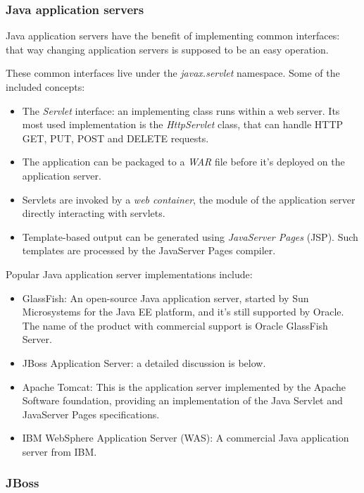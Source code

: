 \subsubsection*{Java application servers}

Java application servers have the benefit of implementing common interfaces:
that way changing application servers is supposed to be an easy operation.

These common interfaces live under the \emph{javax.servlet} namespace\cite{javax-servlet}.
Some of the included concepts:

\begin{itemize}
\item The \emph{Servlet} interface: an implementing class runs within a web
server. Its most used implementation is the \emph{HttpServlet} class, that can
handle HTTP GET, PUT, POST and DELETE requests.
\item The application can be packaged to a \emph{WAR} file before it's deployed
on the application server.
\item Servlets are invoked by a \emph{web container}, the module of the
application server directly interacting with servlets.
\item Template-based output can be generated using \emph{JavaServer Pages}
(JSP). Such templates are processed by the JavaServer Pages compiler.
\end{itemize}

Popular Java application server implementations include:

\begin{itemize}
\item GlassFish: An open-source Java application server, started by Sun
Microsystems for the Java EE platform, and it's still supported by Oracle. The
name of the product with commercial support is Oracle GlassFish Server.
\item JBoss Application Server: a detailed discussion is below.
\item Apache Tomcat: This is the application server implemented by the Apache
Software foundation, providing an implementation of the Java Servlet and
JavaServer Pages specifications.
\item IBM WebSphere Application Server (WAS): A commercial Java application
server from IBM.
\end{itemize}

\subsubsection*{JBoss}

